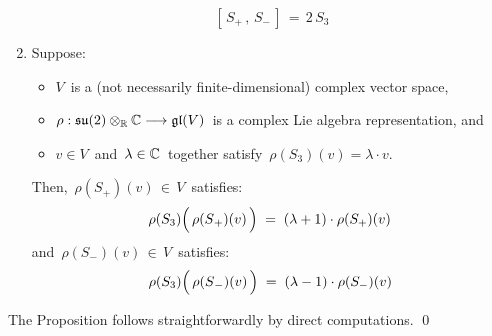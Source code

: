 \begin{proposition}
\begin{enumerate}
\begin{equation*}
	\left[\,S_{+}\,,\,S_{-}\,\right] \, = \, 2\,S_{3}
	\end{equation*}
\item
	Suppose:
	\begin{itemize}
	\item
		$V$\, is a (not necessarily finite-dimensional) complex vector space,
	\item
		$\rho : \mathfrak{su}(2) \otimes_{\mathbb{R}} \mathbb{C} \longrightarrow \mathfrak{gl}(V)$\,
		is a complex Lie algebra representation, and
	\item	
		$v \in V$\, and \,$\lambda \in \mathbb{C}$\, together satisfy \,$\rho(S_{3})(v) = \lambda \cdot v$.
	\end{itemize}	
	Then, \,$\rho(S_{+})(v) \,\in\, V$\, satisfies:
	\begin{equation*}
	\rho(S_{3})\!\left(\,\rho(\overset{{\color{white}.}}{S}_{+})(v)\,\right)
	\; = \;
		(\lambda+1) \cdot \rho(S_{+})(v)\,
	\end{equation*}
	and
	\,$\rho(S_{-})(v) \,\in\, V$\, satisfies:
	\begin{equation*}
	\rho(S_{3})\!\left(\,\rho(\overset{{\color{white}.}}{S}_{-})(v)\,\right)
	\; = \;
		(\lambda-1) \cdot \rho(S_{-})(v)\,
	\end{equation*}
\end{enumerate}
\end{proposition}
\proof
The Proposition follows straightforwardly by direct computations.
\qed



